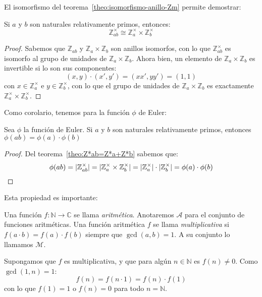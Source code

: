   El isomorfismo del teorema~\ref{theo:isomorfismo-anillo-Zm}
  permite demostrar:
  \begin{theorem}
    \label{theo:Z*ab=Z*a+Z*b}
    Si \(a\) y \(b\) son naturales relativamente primos,
    entonces:
    \begin{equation*}
      \mathbb{Z}^\times_{a b}
	\cong \mathbb{Z}^\times_a \times \mathbb{Z}^\times_b
    \end{equation*}
  \end{theorem}
  \begin{proof}
    Sabemos que \(\mathbb{Z}_{a b}\)
    y \(\mathbb{Z}_a \times \mathbb{Z}_b\)
    son anillos isomorfos,
    con lo que \(\mathbb{Z}^\times_{a b}\)
    es isomorfo al grupo de unidades
    de \(\mathbb{Z}_a \times \mathbb{Z}_b\).
    Ahora bien,
    un elemento de \(\mathbb{Z}_a \times \mathbb{Z}_b\)
    es invertible si lo son sus componentes:
    \begin{equation*}
      (x, y) \cdot (x', y')
	= (x x', y y')
	= (1, 1)
    \end{equation*}
    con \(x \in \mathbb{Z}^\times_a\)
    e \(y \in \mathbb{Z}^\times_b\),
    con lo que el grupo de unidades
    de \(\mathbb{Z}_a \times \mathbb{Z}_b\)
    es exactamente
      \(\mathbb{Z}^\times_a \times \mathbb{Z}^\times_b\).
  \end{proof}
  Como corolario,
  tenemos para la función \(\phi\) de Euler:%
  \begin{corollary}
    \label{cor:phi-multiplicativa}
    Sea \(\phi\) la función de Euler.
    Si \(a\) y \(b\) son naturales relativamente primos,
    entonces \(\phi(a b) = \phi(a) \cdot \phi(b)\)
  \end{corollary}
  \begin{proof}
    Del teorema~\ref{theo:Z*ab=Z*a+Z*b} sabemos que:
    \begin{equation*}
      \phi(a b)
	= \lvert \mathbb{Z}^\times_{a b} \rvert
	= \lvert \mathbb{Z}^\times_a
		   \times \mathbb{Z}^\times_b \rvert
	= \lvert \mathbb{Z}^\times_a \rvert
	    \cdot \lvert \mathbb{Z}^\times_b \rvert
	= \phi(a) \cdot \phi(b)
	\qedhere
    \end{equation*}
  \end{proof}
  Esta propiedad es importante:
  \begin{definition}
    Una función \(f \colon \mathbb{N} \rightarrow \mathbb{C}\)
    se llama \emph{aritmética}.
    Anotaremos \(\mathscr{A}\)
    para el conjunto de funciones aritméticas.
    Una función aritmética \(f\)
    se llama \emph{multiplicativa}
    si \(f(a \cdot b) = f(a) \cdot f(b)\)
    siempre que \(\gcd(a, b) = 1\).
    A su conjunto lo llamamos \(\mathscr{M}\).
  \end{definition}
  \noindent
  Supongamos que \(f\) es multiplicativa,
  y que para algún \(n \in \mathbb{N}\) es \(f(n) \ne 0\).
  Como \(\gcd(1, n) = 1\):
  \begin{equation*}
    f(n)
      = f(n \cdot 1)
      = f(n) \cdot f(1)
  \end{equation*}
  con lo que \(f(1) = 1\) o \(f(n) = 0\)
  para todo \(n = \mathbb{N}\).

